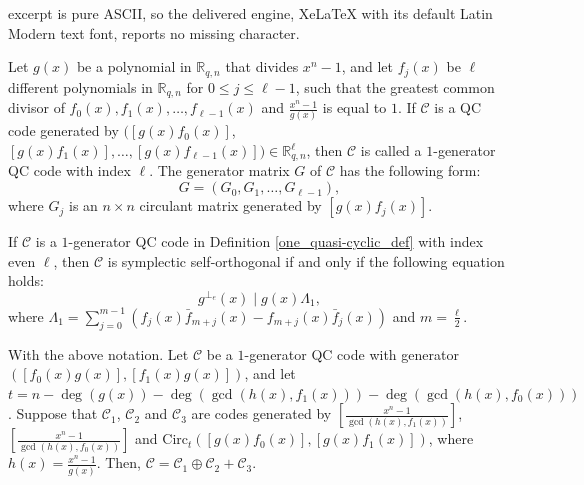\documentclass[10pt,a4paper]{amsart}
\begin{document}
excerpt is pure ASCII, so the delivered engine, XeLaTeX with its default Latin Modern text font, reports no missing character.
\begin{definition}\label{one_quasi-cyclic_def}
	Let $g(x)$ be a polynomial in $\mathbb{R}_{q,n}$ that divides ${{x}^{n}}-1$, and let $f_{j}(x)$ be $\ell$ different polynomials in $\mathbb{R}_{q,n}$ for $0\le j\le \ell-1$, such that the greatest common divisor of $f_0(x),f_1(x),\ldots,f_{\ell-1}(x)$ and $\frac{x^n-1}{g(x)}$ is equal to $1$. 
	If $\mathscr{C}$ is a QC code generated by $(\left[g(x){f}_{0}(x)\right]$, $\left[g(x){f}_{1}(x)\right],\ldots,\left[g(x){f}_{\ell -1}(x)\right]) \in \mathbb{R}_{q,n}^{\ell} $, then $\mathscr{C}$ is called a $1$-generator QC code with index $\ell$.
	The generator matrix $G$ of $\mathscr{C}$  has the following form:
	\begin{equation}
		G=\left(G_{0}, G_{1}, \ldots, G_{\ell-1}\right) ,
	\end{equation}
	where $G_ {j} $ is an $n\times n$  circulant matrix generated by $\left[g (x) f_{j} (x)\right]$.
\end{definition}

\begin{theorem}\label{one_quasi-cyclic}
	If $\mathscr{C}$ is a $1$-generator QC code in Definition \ref{one_quasi-cyclic_def} with index even $\ell$, then $\mathscr{C}$ is symplectic self-orthogonal if and only if the following equation holds:
	\begin{equation}
		g^{\perp_e}(x)\mid g(x)\Lambda_1,
	\end{equation}
where $\Lambda_1 =\sum\limits_{j = 0}^{m - 1}( {f_j}(x){{\bar f}_{m + j}}(x) - {f_{m + j}}(x){{\bar f}_j}(x) )$ and $m=\frac{\ell}{2}$.
\end{theorem}

\begin{lemma}\label{QCmatrix_spread}
	With the above notation.
	Let $\mathscr{C}$ be a $1$-generator QC code with generator $(\left[f_0(x)g(x)\right],\left[f_1(x)g(x)\right])$, and let $t=n-\deg(g(x))-\deg(\gcd( h(x),f_1(x)))-\deg(\gcd( h(x),f_0(x)))$.
	Suppose that $\mathscr{C}_1$, $\mathscr{C}_2$ and $\mathscr{C}_3$ are codes generated by $\left[\frac{x^n-1}{\gcd( h(x),f_1(x))}\right]$, $\left[ \frac{x^n-1}{\gcd( h(x),f_0(x))}\right]$ and $\mathrm{Circ}_t\left( \left[g(x)f_0(x)\right],\left[g(x)f_1(x)\right] \right)$, where $h(x)=\frac{x^n-1}{g(x)}$. Then,  $\mathscr{C}=\mathscr{C}_1\oplus \mathscr{C}_2 + \mathscr{C}_3$.
\end{lemma}
\end{document}
